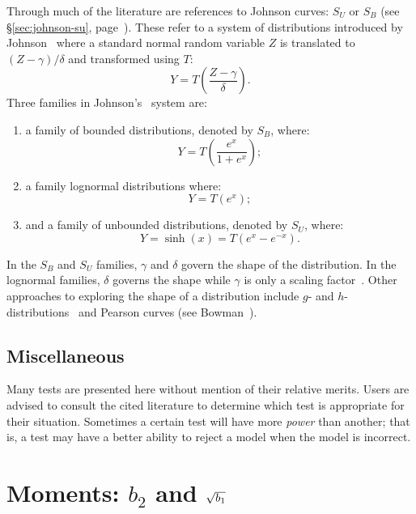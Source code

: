 \documentclass[draft]{article}
\begin{document}
Through much of the literature are references to Johnson
curves: \(S_U\) or \(S_B\) (see \S\ref{sec:johnson-su},
page~\pageref{sec:johnson-su}).
These refer to a system of distributions introduced by
Johnson~\cite{johnson49} where a standard normal random
variable \(Z\) is translated to \(\left(Z-\gamma\right)/\delta\)
and transformed using \(T\):
\begin{equation}
Y=T\left(\frac{Z-\gamma}{\delta}\right).
\end{equation}
Three families in Johnson's~\cite{johnson49} system are:
\begin{enumerate}
\item a family of bounded distributions, denoted by \(S_B\), where:
\begin{equation}
Y=T\left( \frac{e^x}{1+e^x} \right);
\end{equation}
\item a family lognormal distributions where:
\begin{equation}
Y=T\left( e^x \right);
\end{equation}
\item and a family of unbounded distributions, denoted by \(S_U\), where:
\begin{equation}
Y=\sinh\left(x\right) = T\left( e^x-e^{-x} \right).
\end{equation}
\end{enumerate}
In the \(S_B\) and \(S_U\) families, \(\gamma\) and \(\delta\)
govern the shape of the distribution. In the lognormal families,
\(\delta\) governs the shape while \(\gamma\) is only a scaling
factor~\cite{hoaglin85c}. Other approaches to exploring the
shape of a distribution include \(g\)- and
\(h\)-distributions~\cite{hoaglin85c} and
Pearson curves (see Bowman~\cite{bowman86}).

\subsection{Miscellaneous}

Many tests are presented here without mention of their relative
merits. Users are advised to consult the cited literature to
determine which test is appropriate for their situation. Sometimes
a certain test will have more \emph{power} than another; that is,
a test may have a better ability to reject a model when
the model is incorrect.

\section{Moments: \(b_2\) and \(\protect\sqrt{b_1}\)}
\end{document}
